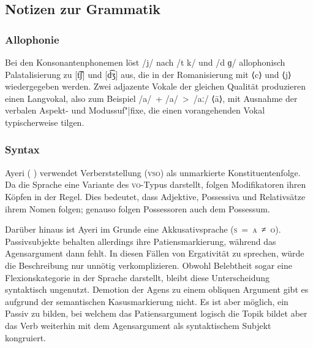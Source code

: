 \documentclass[
	12pt,
	ngerman,
]{scrartcl}
\let\q\textquote
\newcommand{\zwsp}{\mbox{​}} %
\newcommand{\ayr}[1]{\zwsp\smash{{\Tagati #1}}} %
\newcommand{\rayr}[2]{\zwsp\smash{{\Tagati #1}} \emph{#2}} %
\newcommand{\xayr}[3]{\zwsp\smash{\Tagati #1} \emph{#2} `#3'} %
\begin{document}
\subsection{Notizen zur Grammatik}
\label{subsec:gramnot}

\subsubsection{Allophonie}

Bei den Konsonantenphonemen löst /j/ nach /t k/ und /d ɡ/ allophonisch
Palatalisierung zu [t͡ʃ] und [d͡ʒ] aus, die in der Romanisierung mit ⟨c⟩ und
⟨j⟩ wiedergegeben werden.
Zwei adjazente Vokale der gleichen Qualität produzieren einen Langvokal, also
zum Beispiel /a/~+ /a/~>~/aː/ ⟨ā⟩, mit Ausnahme der verbalen Aspekt- und
Modussuf"|fixe, die einen vorangehenden Vokal typischerweise tilgen.

\subsubsection{Syntax}

Ayeri (\,\ayr{Ayeri}\,) verwendet Verberststellung (\textsc{vso}) als
unmarkierte Konstituentenfolge. Da die Sprache eine Variante des
\textsc{vo}-Typus darstellt, folgen Modifikatoren ihren Köpfen in der Regel.
Dies bedeutet, dass Adjektive, Possessiva und Relativsätze ihrem Nomen folgen;
genauso folgen Possessoren auch dem Possessum.

Darüber hinaus ist Ayeri im Grunde eine Akkusativsprache (\textsc{s~=~a~≠~o}).
\q{Echte} Passivsubjekte behalten allerdings ihre Patiensmarkierung, während
das Agensargument dann fehlt. In diesen Fällen von Ergativität zu sprechen,
würde die Beschreibung nur unnötig verkomplizieren. Obwohl Belebtheit sogar
eine Flexionskategorie in der Sprache darstellt, bleibt diese Unterscheidung
syntaktisch ungenutzt. Demotion der Agens zu einem obliquen Argument gibt es
aufgrund der semantischen Kasusmarkierung nicht. Es ist aber möglich, ein
\q{unechtes} Passiv zu bilden, bei welchem das Patiensargument logisch die
Topik bildet aber das Verb weiterhin mit dem Agensargument als syntaktischem
Subjekt kongruiert.
\end{document}
